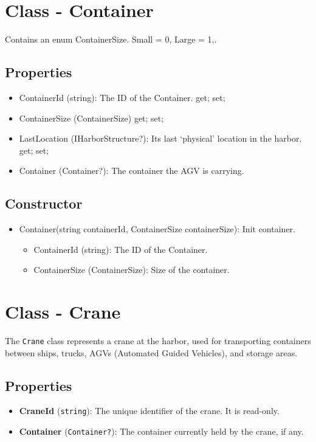 \documentclass[12pt]{article}
\begin{document}
\newpage
\section*{Class - Container}

Contains an enum ContainerSize.
Small = 0, Large = 1,.

\subsection*{Properties}
    \begin{itemize}
        \item ContainerId (string): The ID of the Container. { get; set; }
        \item ContainerSize (ContainerSize) { get; set; }
        \item LastLocation (IHarborStructure?): Its last `physical' location in the harbor. { get; set; }
        \item Container (Container?): The container the AGV is carrying.
    \end{itemize}
\subsection*{Constructor}
\begin{itemize}
    \item Container(string containerId, ContainerSize containerSize): Init container.
    \begin{itemize}
        \item ContainerId (string): The ID of the Container.
        \item ContainerSize (ContainerSize): Size of the container.
    \end{itemize}
\end{itemize}

\newpage
\section*{Class - Crane}

The \texttt{Crane} class represents a crane at the harbor, used for transporting containers between ships, trucks, AGVs (Automated Guided Vehicles), and storage areas.

\subsection*{Properties}

\begin{itemize}
    \item \textbf{CraneId} (\texttt{string}): The unique identifier of the crane. It is read-only.
    \item \textbf{Container} (\texttt{Container?}): The container currently held by the crane, if any.
\end{itemize}
\end{document}
